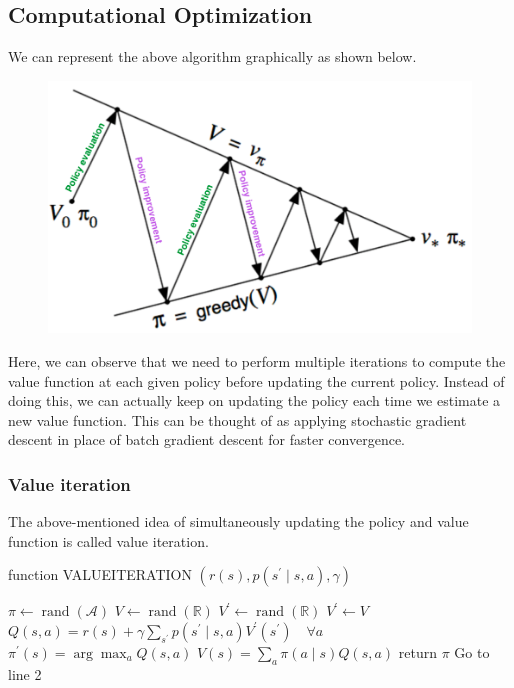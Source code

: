 \documentclass[11pt]{article}
\begin{document}
\subsection{Computational Optimization}
We can represent the above algorithm graphically as shown below. \\
\begin{figure}[H]
    \centering
    \includegraphics[scale=0.35]{images/policy_iteration.png}
    
\end{figure}
Here, we can observe that we need to perform multiple iterations to compute the value function at each given policy before updating the current policy. Instead of doing this, we can actually keep on updating the policy each time we estimate a new value function. This can be thought of as applying stochastic gradient descent in place of batch gradient descent for faster convergence.
\subsubsection{Value iteration}
The above-mentioned idea of simultaneously updating the policy and value function is called value iteration. 
	\begin{algorithm}[H]
	\caption{function VALUEITERATION $\left(r(s), p\left(s^{\prime} \mid s, a\right), \gamma\right)$}
    \begin{algorithmic}[1]
    \STATE $\pi \leftarrow \operatorname{rand}(\mathcal{A})$
    \STATE $V \leftarrow \operatorname{rand}(\mathbb{R})$
    \STATE $V^{\prime} \leftarrow \operatorname{rand}(\mathbb{R})$
    \STATE $V^{\prime} \leftarrow V$
    \STATE $Q(s, a)=r(s)+\gamma \sum_{s^{\prime}} p\left(s^{\prime} \mid s, a\right) V^{\prime}\left(s^{\prime}\right) \quad \forall a$
    \STATE $\pi^{\prime}(s)=\arg \max _{a} Q(s, a)$
    \STATE $V(s)=\sum_{a} \pi(a \mid s) Q(s, a)$
    \ENDFOR
    \ENDWHILE
    \IF{$\pi^{\prime}=\pi$}
    \STATE return $\pi$
    \ENDIF
    \STATE Go to line 2
    \end{algorithmic}
	\end{algorithm}
\end{document}
